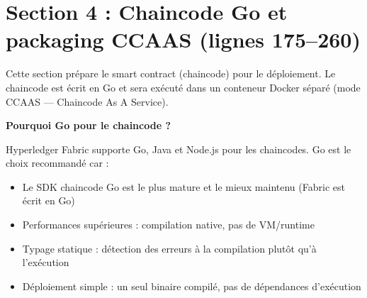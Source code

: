 \documentclass[12pt,a4paper,twoside]{report}
\begin{document}
\section{Section 4 : Chaincode Go et packaging CCAAS (lignes 175--260)}

Cette section prépare le smart contract (chaincode) pour le déploiement. Le chaincode est écrit en Go et sera exécuté dans un conteneur Docker séparé (mode CCAAS --- Chaincode As A Service).

\begin{infobox}
\textbf{Pourquoi Go pour le chaincode ?}

Hyperledger Fabric supporte Go, Java et Node.js pour les chaincodes. Go est le choix recommandé car :
\begin{itemize}
    \item Le SDK chaincode Go est le plus mature et le mieux maintenu (Fabric est écrit en Go)
    \item Performances supérieures : compilation native, pas de VM/runtime
    \item Typage statique : détection des erreurs à la compilation plutôt qu'à l'exécution
    \item Déploiement simple : un seul binaire compilé, pas de dépendances d'exécution
\end{itemize}
\end{infobox}
\end{document}
